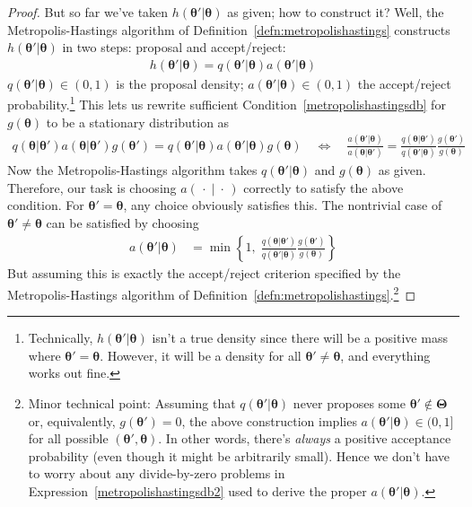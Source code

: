 \documentclass[12pt]{article}
\theoremstyle{plain}
\theoremstyle{definition}
\theoremstyle{remark}
\newcommand{\bstheta}{\boldsymbol{\theta}}
\newcommand{\bsTheta}{\boldsymbol{\Theta}}
\begin{document}
\begin{proof}
But so far we've taken $h(\bstheta'|\bstheta)$ as given; how to
construct it?
Well, the Metropolis-Hastings algorithm of
Definition~\ref{defn:metropolishastings} constructs
$h(\bstheta'|\bstheta)$ in two steps: proposal and accept/reject:
\begin{align}
  h(\bstheta'|\bstheta)
  =
  q(\bstheta'|\bstheta)
  a(\bstheta'|\bstheta)
  \label{metropolishastingssplit}
\end{align}
$q(\bstheta'|\bstheta)\in(0,1)$ is the proposal density;
$a(\bstheta'|\bstheta)\in(0,1)$
the accept/reject probability.\footnote{%
  Technically, $h(\bstheta'|\bstheta)$ isn't a true density since there
  will be a positive mass where $\bstheta'=\bstheta$. However, it will
  be a density for all $\bstheta'\neq\bstheta$, and everything works out
  fine.
}
This lets us rewrite sufficient Condition~\ref{metropolishastingsdb} for
$g(\bstheta)$ to be a stationary distribution as
\begin{align}
  q(\bstheta|\bstheta')
  a(\bstheta|\bstheta')
  g(\bstheta')
  =
  q(\bstheta'|\bstheta)
  a(\bstheta'|\bstheta)
  g(\bstheta)
  \quad\iff\quad
  \frac{a(\bstheta'|\bstheta)}{a(\bstheta|\bstheta')}
  =
  \frac{q(\bstheta|\bstheta')}{q(\bstheta'|\bstheta)}
  \frac{g(\bstheta')}{g(\bstheta)}
  \label{metropolishastingsdb2}
\end{align}
Now the Metropolis-Hastings algorithm takes $q(\bstheta'|\bstheta)$ and
$g(\bstheta)$ as given. Therefore, our task is choosing
$a(\,\cdot\;|\;\cdot\,)$
correctly to satisfy the above condition.
For $\bstheta'=\bstheta$, any choice obviously satisfies this.
The nontrivial case of $\bstheta'\neq\bstheta$ can be satisfied by
choosing
\begin{align}
  a(\bstheta'|\bstheta)
  &=
  \min\left\{1,\;
  \frac{q(\bstheta|\bstheta')}{q(\bstheta'|\bstheta)}
  \frac{g(\bstheta')}{g(\bstheta)}
  \right\}
  \label{metropolishastingsaccept}
\end{align}
But assuming this is exactly the accept/reject criterion specified by the
Metropolis-Hastings algorithm of
Definition~\ref{defn:metropolishastings}.\footnote{%
  Minor technical point: Assuming that
  $q(\bstheta'|\bstheta)$ never proposes some $\bstheta'\not\in\bsTheta$
  or, equivalently, $g(\bstheta')=0$, the above construction implies
  $a(\bstheta'|\bstheta)\in(0,1]$ for all possible $(\bstheta',\bstheta)$.
  In other words, there's \emph{always} a positive acceptance probability
  (even though it might be arbitrarily small). Hence we don't have to
  worry about any divide-by-zero problems in
  Expression~\ref{metropolishastingsdb2} used to derive the proper
  $a(\bstheta'|\bstheta)$.
}


\end{proof}
\end{document}
